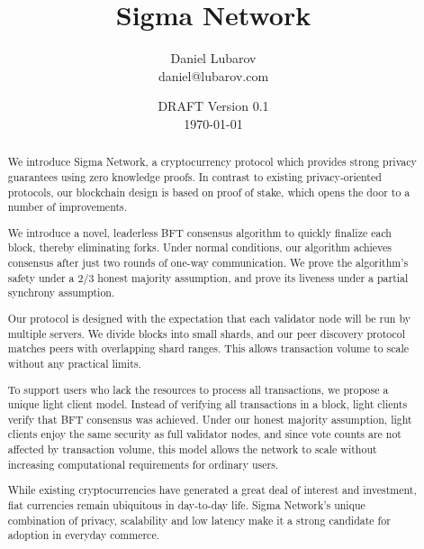 \documentclass[12pt]{article}
\title{Sigma Network}
\author{Daniel Lubarov\\daniel@lubarov.com}
\date{DRAFT Version 0.1\\\today}
\begin{document}
\maketitle

\begin{abstract}
  We introduce Sigma Network, a cryptocurrency protocol which provides strong privacy guarantees using zero knowledge proofs. In contrast to existing privacy-oriented protocols, our blockchain design is based on proof of stake, which opens the door to a number of improvements.

  We introduce a novel, leaderless BFT consensus algorithm to quickly finalize each block, thereby eliminating forks. Under normal conditions, our algorithm achieves consensus after just two rounds of one-way communication. We prove the algorithm's safety under a 2/3 honest majority assumption, and prove its liveness under a partial synchrony assumption.

  Our protocol is designed with the expectation that each validator node will be run by multiple servers. We divide blocks into small shards, and our peer discovery protocol matches peers with overlapping shard ranges. This allows transaction volume to scale without any practical limits.

  To support users who lack the resources to process all transactions, we propose a unique light client model. Instead of verifying all transactions in a block, light clients verify that BFT consensus was achieved. Under our honest majority assumption, light clients enjoy the same security as full validator nodes, and since vote counts are not affected by transaction volume, this model allows the network to scale without increasing computational requirements for ordinary users.

  While existing cryptocurrencies have generated a great deal of interest and investment, fiat currencies remain ubiquitous in day-to-day life. Sigma Network's unique combination of privacy, scalability and low latency make it a strong candidate for adoption in everyday commerce.
\end{abstract}

\newpage
\tableofcontents
\newpage










{}

\end{document}

